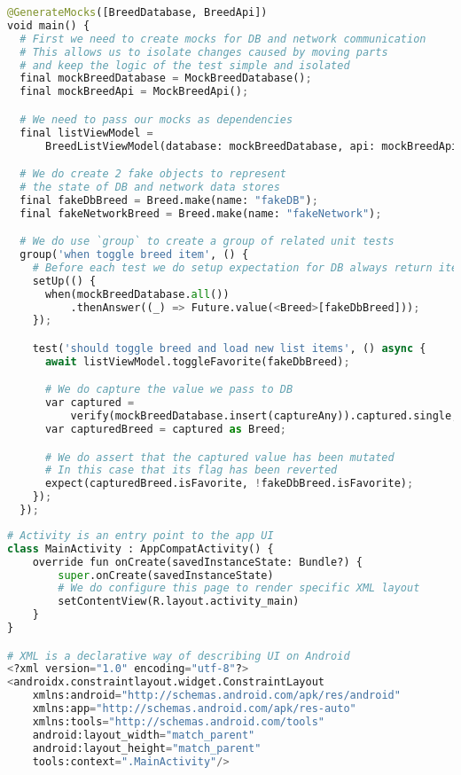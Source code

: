 \begin{lstlisting}[style=light, language=Python,label={lst:flutter_unit_test},caption=Flutter Unit Test]
@GenerateMocks([BreedDatabase, BreedApi])
void main() {
  # First we need to create mocks for DB and network communication
  # This allows us to isolate changes caused by moving parts
  # and keep the logic of the test simple and isolated
  final mockBreedDatabase = MockBreedDatabase();
  final mockBreedApi = MockBreedApi();

  # We need to pass our mocks as dependencies
  final listViewModel =
      BreedListViewModel(database: mockBreedDatabase, api: mockBreedApi);

  # We do create 2 fake objects to represent
  # the state of DB and network data stores
  final fakeDbBreed = Breed.make(name: "fakeDB");
  final fakeNetworkBreed = Breed.make(name: "fakeNetwork");

  # We do use `group` to create a group of related unit tests
  group('when toggle breed item', () {
    # Before each test we do setup expectation for DB always return items
    setUp(() {
      when(mockBreedDatabase.all())
          .thenAnswer((_) => Future.value(<Breed>[fakeDbBreed]));
    });

    test('should toggle breed and load new list items', () async {
      await listViewModel.toggleFavorite(fakeDbBreed);

      # We do capture the value we pass to DB
      var captured =
          verify(mockBreedDatabase.insert(captureAny)).captured.single;
      var capturedBreed = captured as Breed;

      # We do assert that the captured value has been mutated
      # In this case that its flag has been reverted
      expect(capturedBreed.isFavorite, !fakeDbBreed.isFavorite);
    });
  });
\end{lstlisting}

\begin{lstlisting}[style=light, language=Python,label={lst:android_xml},caption=Android UI with XML]
# Activity is an entry point to the app UI
class MainActivity : AppCompatActivity() {
    override fun onCreate(savedInstanceState: Bundle?) {
        super.onCreate(savedInstanceState)
        # We do configure this page to render specific XML layout
        setContentView(R.layout.activity_main)
    }
}

# XML is a declarative way of describing UI on Android
<?xml version="1.0" encoding="utf-8"?>
<androidx.constraintlayout.widget.ConstraintLayout
    xmlns:android="http://schemas.android.com/apk/res/android"
    xmlns:app="http://schemas.android.com/apk/res-auto"
    xmlns:tools="http://schemas.android.com/tools"
    android:layout_width="match_parent"
    android:layout_height="match_parent"
    tools:context=".MainActivity"/>
\end{lstlisting}

